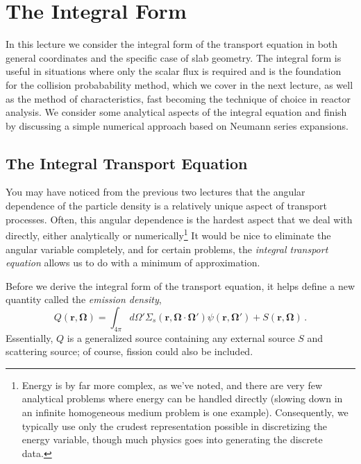 \chapter{The Integral Form}

In this lecture we consider the integral form of the transport equation in both general coordinates and the specific case of slab geometry.  The integral form is useful in situations where only the scalar flux is required and is the foundation for the collision probabability method, which we cover in the next lecture, as well as the method of characteristics, fast becoming the technique of choice in reactor analysis.  We consider some analytical aspects of the integral equation and finish by discussing a simple numerical approach based on Neumann series expansions.

\section*{The Integral Transport Equation}

You may have noticed from the previous two lectures that the angular dependence of the particle density is a relatively unique aspect of transport processes.  Often, this angular dependence is the hardest aspect that we deal with directly, either analytically or numerically\footnote{Energy is by far more complex, as we've noted, and there are very few analytical problems where energy can be handled directly (slowing down in an infinite homogeneous medium problem is one example). Consequently, we typically use only the crudest representation possible in discretizing the energy variable, though much physics goes into generating the discrete data.}  It would be nice to eliminate the angular variable completely, and for certain problems, the \textit{ integral transport equation} allows us to do with a minimum of approximation.

Before we derive the integral form of the transport equation, it helps define a new quantity called the \textit{emission density},
\begin{equation}
  Q(\mathbf{r},\mathbf{\Omega}) = \int_{4\pi} d\Omega' \Sigma_s(\mathbf{r},\mathbf{\Omega}\cdot\mathbf{\Omega}')\psi(\mathbf{r},\mathbf{\Omega'}) + S(\mathbf{r},\mathbf{\Omega}) \, .
  \label{eq:emissiondensity}
\end{equation}
Essentially, $Q$ is a generalized source containing any external source $S$ and scattering source; of course, fission could also be included.


